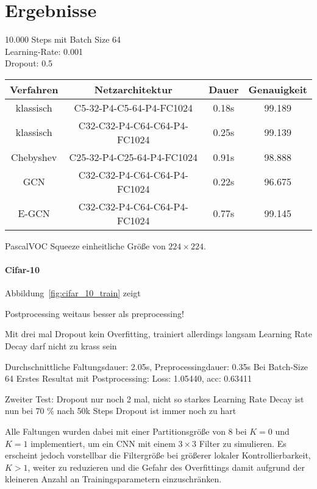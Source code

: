 \section{Ergebnisse}
\label{ergebnisse}

10.000 Steps mit Batch Size 64\\
Learning-Rate: 0.001\\
Dropout: 0.5\\

\begin{tabular}{cccc}
  \toprule
  Verfahren & Netzarchitektur & Dauer & Genauigkeit\\
  \midrule
  klassisch & C5-32-P4-C5-64-P4-FC1024 & 0.18s & 99.189\\
  klassisch & C32-C32-P4-C64-C64-P4-FC1024 & 0.25s & 99.139\\
  Chebyshev & C25-32-P4-C25-64-P4-FC1024 & 0.91s & 98.888\\
  GCN & C32-C32-P4-C64-C64-P4-FC1024 & 0.22s & 96.675\\
  E-GCN & C32-C32-P4-C64-C64-P4-FC1024 & 0.77s & 99.145\\
  \bottomrule
\end{tabular}


PascalVOC Squeeze einheitliche Größe von $224 \times 224$.

\paragraph{\gls{Cifar}-10}

Abbildung~\ref{fig:cifar_10_train} zeigt


Postprocessing weitaus besser als preprocessing!

Mit drei mal Dropout kein Overfitting, trainiert allerdings langsam
Learning Rate Decay darf nicht zu krass sein

Durchschnittliche Faltungsdauer: 2.05s, Preprocessingdauer: 0.35s
Bei Batch-Size 64
Erstes Resultat mit Postprocessing:
Loss: 1.05440, acc: 0.63411

Zweiter Test:
Dropout nur noch 2 mal, nicht so starkes Learning Rate Decay
ist nun bei 70 \% nach 50k Steps
Dropout ist immer noch zu hart

Alle Faltungen wurden dabei mit einer Partitionsgröße von $8$ bei $K=0$ und $K=1$ implementiert, um ein \gls{CNN} mit einem $3 \times 3$ Filter zu simulieren.
Es erscheint jedoch vorstellbar die Filtergröße bei größerer lokaler Kontrollierbarkeit, \dhe{} $K > 1$, weiter zu reduzieren und die Gefahr des Overfittings damit aufgrund der kleineren Anzahl an Trainingsparametern einzuschränken.
